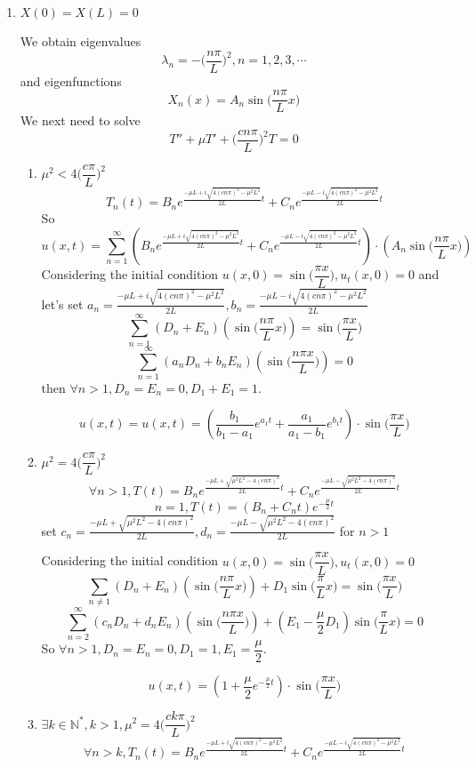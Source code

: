 \documentclass[a4paper,12pt,titlepage]{article}
\begin{document}
\begin{enumerate}
\item $X(0)=X(L)=0$

We obtain eigenvalues 
$$\lambda_n=-\Big(\dfrac{n\pi}{L}\Big)^2,n=1,2,3,\cdots$$
and eigenfunctions
$$X_n(x)=A_n\sin\Big(\dfrac{n\pi}{L}x\Big)$$
We next need to solve
$$T''+\mu T'+\Big(\dfrac{cn\pi}{L}\Big)^2T=0$$
\begin{enumerate}
\item $\mu^2<4\Big(\dfrac{c\pi}{L}\Big)^2$
$$T_n(t)=B_ne^{\frac{-\mu L+i\sqrt{4(cn\pi)^2-\mu^2L^2}}{2L}t}+C_ne^{\frac{-\mu L-i\sqrt{4(cn\pi)^2-\mu^2L^2}}{2L}t}$$
So
$$u(x,t)=\sum\limits_{n=1}^{\infty}(B_ne^{\frac{-\mu L+i\sqrt{4(cn\pi)^2-\mu^2L^2}}{2L}t}+C_ne^{\frac{-\mu L-i\sqrt{4(cn\pi)^2-\mu^2L^2}}{2L}t})\cdot (A_n\sin\Big(\dfrac{n\pi}{L}x\Big))$$
Considering the initial condition $u(x,0)=\sin\Big(\dfrac{\pi x}{L}\Big),u_t(x,0)=0$ and let's set $a_n=\frac{-\mu L+i\sqrt{4(cn\pi)^2-\mu^2L^2}}{2L},b_n=\frac{-\mu L-i\sqrt{4(cn\pi)^2-\mu^2L^2}}{2L}$
$$\sum\limits_{n=1}^{\infty}(D_n+E_n)(\sin\Big(\dfrac{n\pi}{L}x\Big))=\sin\Big(\dfrac{\pi x}{L}\Big)$$
$$\sum\limits_{n=1}^{\infty}(a_nD_n+b_nE_n)(\sin\Big(\dfrac{n\pi x}{L}\Big))=0$$
then $\forall n>1,D_n=E_n=0,D_1+E_1=1$. 


$$u(x,t)=u(x,t)=(\dfrac{b_1}{b_1-a_1}e^{a_1t}+\dfrac{a_1}{a_1-b_1}e^{b_1t})\cdot \sin\Big(\dfrac{\pi x}{L}\Big)$$

\item $\mu^2=4\Big(\dfrac{c\pi}{L}\Big)^2$
$$\forall n> 1, T(t)=B_ne^{\frac{-\mu L+\sqrt{\mu^2L^2-4(cn\pi)^2}}{2L}t}+C_ne^{\frac{-\mu L-\sqrt{\mu^2L^2-4(cn\pi)^2}}{2L}t}$$
$$ n= 1, T(t)=(B_n+C_nt)e^{-\frac{\mu}{2}t}$$
set $c_n=\frac{-\mu L+\sqrt{\mu^2L^2-4(cn\pi)^2}}{2L},d_n=\frac{-\mu L-\sqrt{\mu^2L^2-4(cn\pi)^2}}{2L}$ for $n>1$

Considering the initial condition $u(x,0)=\sin\Big(\dfrac{\pi x}{L}\Big),u_t(x,0)=0$
$$\sum\limits_{n\neq 1}(D_n+E_n)(\sin\Big(\dfrac{n\pi}{L}x\Big))+D_1\sin\Big(\dfrac{\pi}{L}x\Big)=\sin\Big(\dfrac{\pi x}{L}\Big)$$
$$\sum\limits_{n=2}^{\infty}(c_nD_n+d_nE_n)(\sin\Big(\dfrac{n\pi x}{L}\Big))+(E_1-\dfrac{\mu}{2}D_1)\sin\Big(\dfrac{\pi}{L}x\Big)=0$$
So $\forall n>1,D_n=E_n=0,D_1=1,E_1=\dfrac{\mu}{2}$. 


$$u(x,t)=(1+\dfrac{\mu}{2}e^{-\frac{\mu}{2}t})\cdot \sin\Big(\dfrac{\pi x}{L}\Big)$$

\item $\exists k\in\mathbb{N}^*,k>1, \mu^2=4\Big(\dfrac{ck\pi}{L}\Big)^2$
$$\forall n>k, T_n(t)=B_ne^{\frac{-\mu L+i\sqrt{4(cn\pi)^2-\mu^2L^2}}{2L}t}+C_ne^{\frac{-\mu L-i\sqrt{4(cn\pi)^2-\mu^2L^2}}{2L}t}$$


\end{enumerate}
\end{enumerate}
\end{document}
